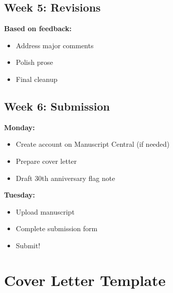 \documentclass[11pt]{article}
\begin{document}
\subsection*{Week 5: Revisions}

\textbf{Based on feedback:}
\begin{itemize}[leftmargin=*]
    \item Address major comments
    \item Polish prose
    \item Final cleanup
\end{itemize}

\subsection*{Week 6: Submission}

\textbf{Monday:}
\begin{itemize}[leftmargin=*]
    \item Create account on Manuscript Central (if needed)
    \item Prepare cover letter
    \item Draft 30th anniversary flag note
\end{itemize}

\textbf{Tuesday:}
\begin{itemize}[leftmargin=*]
    \item Upload manuscript
    \item Complete submission form
    \item Submit!
\end{itemize}

\section{Cover Letter Template}
\end{document}
